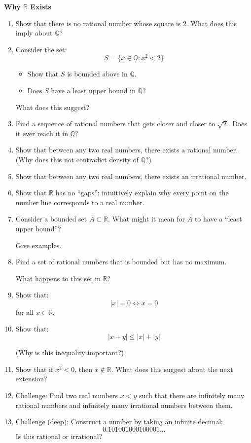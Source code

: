 \documentclass[11pt]{article}
\newcommand{\Q}{\mathbb{Q}}
\newcommand{\R}{\mathbb{R}}
\begin{document}
\begin{problembox}

\textbf{Why $\R$ Exists}

\begin{enumerate}

\item Show that there is no rational number whose square is $2$.  
What does this imply about $\Q$?

\item Consider the set:
\[
S = \{x \in \Q : x^2 < 2\}
\]

\begin{itemize}
\item Show that $S$ is bounded above in $\Q$.
\item Does $S$ have a least upper bound in $\Q$?
\end{itemize}

What does this suggest?

\item Find a sequence of rational numbers that gets closer and closer to $\sqrt{2}$.  
Does it ever reach it in $\Q$?

\item Show that between any two real numbers, there exists a rational number.  
(Why does this not contradict density of $\Q$?)

\item Show that between any two real numbers, there exists an irrational number.

\item Show that $\R$ has no “gaps”:  
intuitively explain why every point on the number line corresponds to a real number.

\item Consider a bounded set $A \subset \R$.  
What might it mean for $A$ to have a “least upper bound”?

Give examples.

\item Find a set of rational numbers that is bounded but has no maximum.

What happens to this set in $\R$?

\item Show that:
\[
|x| = 0 \iff x = 0
\]
for all $x \in \R$.

\item Show that:
\[
|x+y| \le |x| + |y|
\]

(Why is this inequality important?)

\item Show that if $x^2 < 0$, then $x \notin \R$.  
What does this suggest about the next extension?

\item Challenge:  
Find two real numbers $x < y$ such that there are infinitely many rational numbers and infinitely many irrational numbers between them.

\item Challenge (deep):  
Construct a number by taking an infinite decimal:
\[
0.101001000100001\dots
\]
Is this rational or irrational?

\end{enumerate}

\end{problembox}
\end{document}
